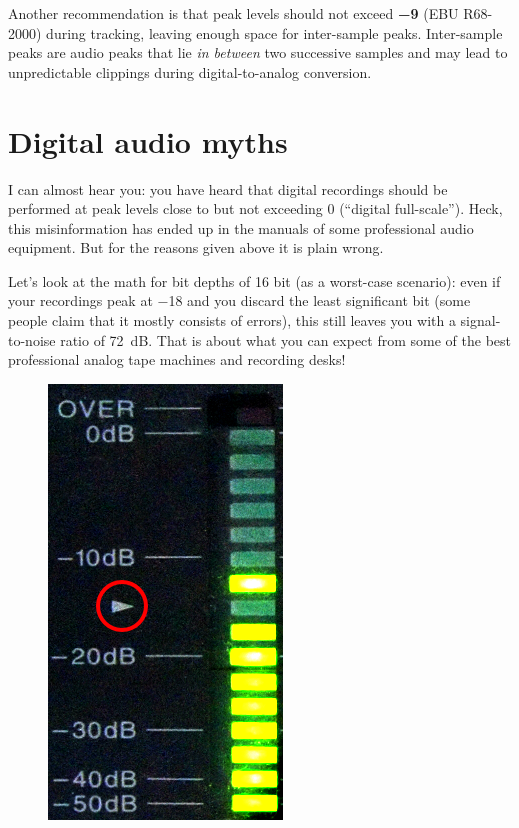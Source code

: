Another recommendation is that peak levels should not exceed
\textbf{\SI{-9}{\dBFS}} (EBU R68-2000) during tracking, leaving enough
space for inter-sample peaks.  Inter-sample peaks are audio peaks that
lie \emph{in between} two successive samples and may lead to
unpredictable clippings during digital-to-analog conversion.

\section{Digital audio myths}
\label{sec:digital_audio_myths}

I can almost hear you: you have heard that digital recordings should
be performed at peak levels close to but not exceeding \SI{0}{\dBFS}
(``digital full-scale'').  Heck, this misinformation has ended up in
the manuals of some professional audio equipment.  But for the reasons
given above it is plain wrong.

Let's look at the math for bit depths of 16 bit (as a worst-case
scenario): even if your recordings peak at \SI{-18}{\dBFS} and you
discard the least significant bit (some people claim that it mostly
consists of errors), this still leaves you with a signal-to-noise
ratio of \SI{72}{\dB}.  That is about what you can expect from some of
the best professional analog tape machines and recording desks!

\begin{figure}
  \includegraphics[scale=0.24,clip]{include/images/otari_meter.png}
\end{figure}

